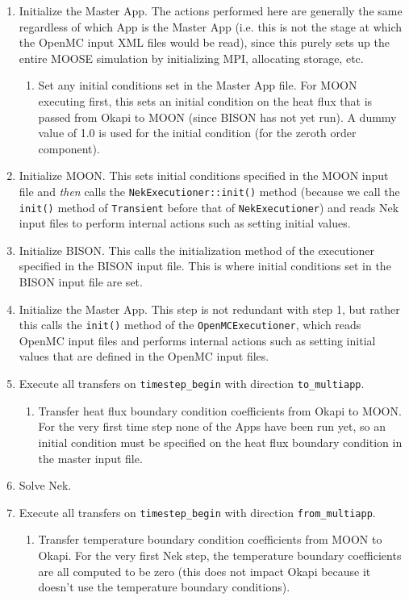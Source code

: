 \documentclass[10pt]{article}
\numberwithin{equation}{section} %
\begin{document}
\begin{enumerate}
\item Initialize the Master App. The actions performed here are generally the same regardless of which App is the Master App (i.e. this is not the stage at which the OpenMC input XML files would be read), since this purely sets up the entire MOOSE simulation by initializing MPI, allocating storage, etc. 
	\begin{enumerate}
	\item Set any initial conditions set in the Master App file. For MOON executing first, this sets an initial condition on the heat flux that is passed from Okapi to MOON (since BISON has not yet run). A dummy value of 1.0 is used for the initial condition (for the zeroth order component).
	\end{enumerate}
\item Initialize MOON. This sets initial conditions specified in the MOON input file and {\it then} calls the {\tt NekExecutioner::init()} method (because we call the {\tt init()} method of {\tt Transient} before that of {\tt NekExecutioner}) and reads Nek input files to perform internal actions such as setting initial values. 
\item Initialize BISON. This calls the initialization method of the executioner specified in the BISON input file. This is where initial conditions set in the BISON input file are set.
%
\item Initialize the Master App. This step is not redundant with step 1, but rather this calls the {\tt init()} method of the {\tt OpenMCExecutioner}, which reads OpenMC input files and performs internal actions such as setting initial values that are defined in the OpenMC input files.
%
\item Execute all transfers on {\tt timestep\_begin} with direction {\tt to\_multiapp}.
	\begin{enumerate}
	\item Transfer heat flux boundary condition coefficients from Okapi to MOON. For the very first time step none of the Apps have been run yet, so an initial condition must be specified on the heat flux boundary condition in the master input file.
	\end{enumerate}
\item Solve Nek.
\item Execute all transfers on {\tt timestep\_begin} with direction {\tt from\_multiapp}.
	\begin{enumerate}
	\item Transfer temperature boundary condition coefficients from MOON to Okapi. For the very first Nek step, the temperature boundary coefficients are all computed to be zero (this does not impact Okapi because it doesn't use the temperature boundary conditions).

\end{enumerate}
\end{enumerate}
\end{document}
